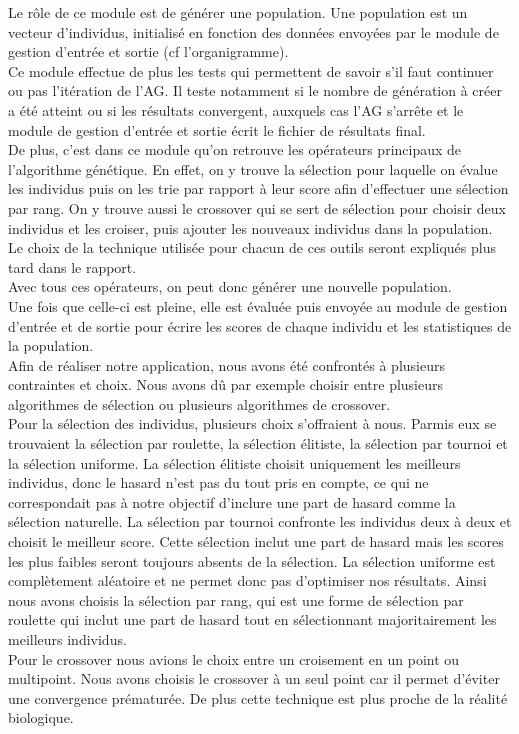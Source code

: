\documentclass[a4paper,11pt]{article}
\begin{document}
			Le rôle de ce module est de générer une population.
			Une population est un vecteur d’individus, initialisé en fonction des données envoyées par le module de gestion d’entrée et sortie (cf l’organigramme).\\
			Ce module effectue de plus les tests qui permettent de savoir s’il faut continuer ou pas l’itération de l’AG.
			Il teste notamment si le nombre de génération à créer a été atteint ou si les résultats convergent, auxquels cas l’AG s’arrête et le module de gestion d’entrée et sortie écrit le fichier de résultats final.\\
			De plus, c’est dans ce module qu’on retrouve les opérateurs principaux de l’algorithme génétique.
			En effet, on y trouve la sélection pour laquelle on évalue les individus puis on les trie par rapport à leur score afin d’effectuer une sélection par rang.
			On y trouve aussi le crossover qui se sert de sélection pour choisir deux individus et les croiser, puis ajouter les nouveaux individus dans la population.
			Le choix de la technique utilisée pour chacun de ces outils seront expliqués plus tard dans le rapport.\\
			Avec tous ces opérateurs, on peut donc générer une nouvelle population.\\
			Une fois que celle-ci est pleine, elle est évaluée puis envoyée au module de gestion d’entrée et de sortie pour écrire les scores de chaque individu et les statistiques de la population.\\

			Afin de réaliser notre application, nous avons été confrontés à plusieurs contraintes et choix. Nous avons dû par exemple choisir entre plusieurs algorithmes de sélection ou plusieurs algorithmes de crossover.\\
			Pour la sélection des individus, plusieurs choix s’offraient à nous. Parmis eux se trouvaient la sélection par roulette, la sélection élitiste, la sélection par tournoi et la sélection uniforme.
			La sélection élitiste choisit uniquement les meilleurs individus, donc le hasard n’est pas du tout pris en compte, ce qui ne correspondait pas à notre objectif d’inclure une part de hasard comme la sélection naturelle.
			La sélection par tournoi confronte les individus deux à deux et choisit le meilleur score.
			Cette sélection inclut une part de hasard mais les scores les plus faibles seront toujours absents de la sélection.
			La sélection uniforme est complètement aléatoire et ne permet donc pas d’optimiser nos résultats.
			Ainsi nous avons choisis la sélection par rang, qui est une forme de sélection par roulette qui inclut une part de hasard tout en sélectionnant majoritairement les meilleurs individus.\\
			Pour le crossover nous avions le choix entre un croisement en un point ou multipoint.
			Nous avons choisis le crossover à un seul point car il permet d’éviter une convergence prématurée. De plus cette technique est plus proche de la réalité biologique.
\end{document}
